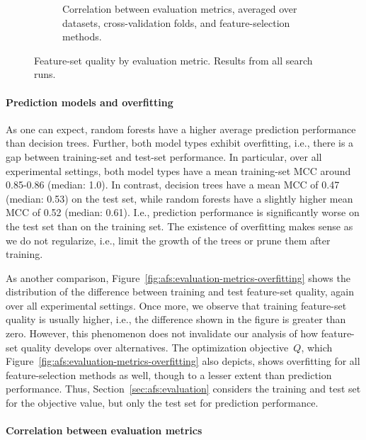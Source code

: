 \documentclass{article}
\theoremstyle{definition}
\begin{document}
\begin{figure}[t]
\begin{subfigure}[t]{0.48\textwidth}
		\caption{Correlation between evaluation metrics, averaged over datasets, cross-valida\-tion folds, and feature-selection methods.}
		\label{fig:afs:evaluation-metrics-correlation}
	\end{subfigure}
	\caption{
		Feature-set quality by evaluation metric.
		Results from all search runs.
	}
	\label{fig:afs:evaluation-metrics}
\end{figure}

\paragraph{Prediction models and overfitting}

As one can expect, random forests have a higher average prediction performance than decision trees.
Further, both model types exhibit overfitting, i.e., there is a gap between training-set and test-set performance.
In particular, over all experimental settings, both model types have a mean training-set MCC around 0.85-0.86 (median: 1.0).
In contrast, decision trees have a mean MCC of 0.47 (median: 0.53) on the test set, while random forests have a slightly higher mean MCC of 0.52 (median: 0.61).
I.e., prediction performance is significantly worse on the test set than on the training set.
The existence of overfitting makes sense as we do not regularize, i.e., limit the growth of the trees or prune them after training.

As another comparison, Figure~\ref{fig:afs:evaluation-metrics-overfitting} shows the distribution of the difference between training and test feature-set quality, again over all experimental settings.
Once more, we observe that training feature-set quality is usually higher, i.e., the difference shown in the figure is greater than zero.
However, this phenomenon does not invalidate our analysis of how feature-set quality develops over alternatives.
The optimization objective~$Q$, which Figure~\ref{fig:afs:evaluation-metrics-overfitting} also depicts, shows overfitting for all feature-selection methods as well, though to a lesser extent than prediction performance.
Thus, Section~\ref{sec:afs:evaluation} considers the training and test set for the objective value, but only the test set for prediction performance.

\paragraph{Correlation between evaluation metrics}
\end{document}
